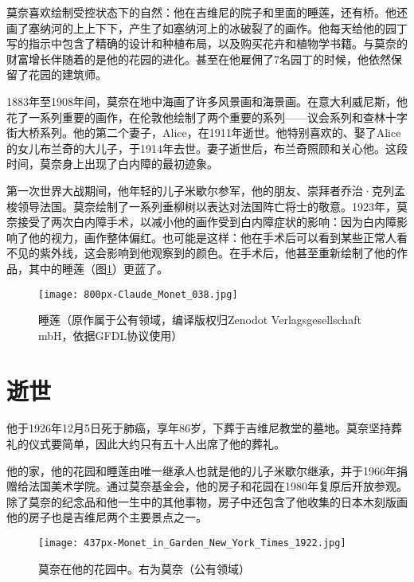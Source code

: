         莫奈喜欢绘制受控状态下的自然：他在吉维尼的院子和里面的睡莲，还有桥。他还画了塞纳河的上上下下，产生了如塞纳河上的冰破裂了的画作。他每天给他的园丁写的指示中包含了精确的设计和种植布局，以及购买花卉和植物学书籍。与莫奈的财富增长伴随着的是他的花园的进化。甚至在他雇佣了7名园丁的时候，他依然保留了花园的建筑师。
        
        1883年至1908年间，莫奈在地中海画了许多风景画和海景画。在意大利威尼斯，他花了一系列重要的画作，在伦敦他绘制了两个重要的系列——议会系列和查林十字街大桥系列。他的第二个妻子，Alice，在1911年逝世。他特别喜欢的、娶了Alice的女儿布兰奇的大儿子，于1914年去世。妻子逝世后，布兰奇照顾和关心他。这段时间，莫奈身上出现了白内障的最初迹象。
        
        第一次世界大战期间，他年轻的儿子米歇尔参军，他的朋友、崇拜者乔治·克列孟梭领导法国。莫奈绘制了一系列垂柳树以表达对法国阵亡将士的敬意。1923年，莫奈接受了两次白内障手术，以减小他的画作受到白内障症状的影响：因为白内障影响了他的视力，画作整体偏红。也可能是这样：他在手术后可以看到某些正常人看不见的紫外线，这会影响到他观察到的颜色。在手术后，他甚至重新绘制了他的作品，其中的睡莲（图\ref{fig:water-lilies}）更蓝了。


        \begin{figure}[h!]
          \centering
          \texttt{[image: 800px-Claude\_Monet\_038.jpg]}
          \caption{睡莲（原作属于公有领域，编译版权归Zenodot Verlagsgesellschaft mbH，依据GFDL协议使用）}
          \label{fig:water-lilies}
        \end{figure}
        
    \section{逝世}
    
        他于1926年12月5日死于肺癌，享年86岁，下葬于吉维尼教堂的墓地。莫奈坚持葬礼的仪式要简单，因此大约只有五十人出席了他的葬礼。
        
        他的家，他的花园和睡莲由唯一继承人也就是他的儿子米歇尔继承，并于1966年捐赠给法国美术学院。通过莫奈基金会，他的房子和花园在1980年复原后开放参观。除了莫奈的纪念品和他一生中的其他事物，房子中还包含了他收集的日本木刻版画他的房子也是吉维尼两个主要景点之一。

        \begin{figure}[h!]
          \centering
          \texttt{[image: 437px-Monet\_in\_Garden\_New\_York\_Times\_1922.jpg]}
          \caption{莫奈在他的花园中。右为莫奈（公有领域）}
          \label{fig:monet-in-gardon}
        \end{figure}

